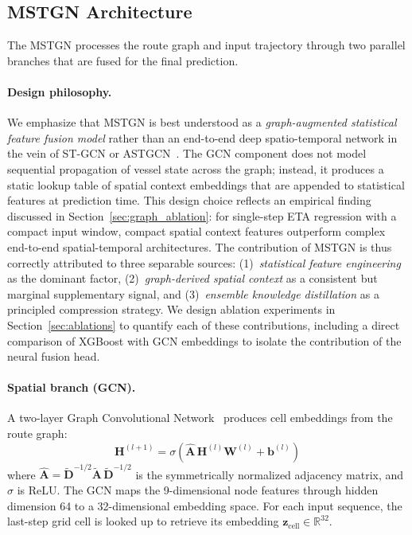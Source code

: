 \documentclass[conference]{IEEEtran}
\begin{document}
\subsection{MSTGN Architecture}
\label{sec:mstgn}

The MSTGN processes the route graph and input trajectory through two parallel branches that are fused for the final prediction.

\paragraph{Design philosophy.}
We emphasize that MSTGN is best understood as a \textit{graph-augmented statistical feature fusion model} rather than an end-to-end deep spatio-temporal network in the vein of ST-GCN or ASTGCN~\cite{daiHybridSpatiotemporalGraph2020}.
The GCN component does not model sequential propagation of vessel state across the graph; instead, it produces a static lookup table of spatial context embeddings that are appended to statistical features at prediction time.
This design choice reflects an empirical finding discussed in Section~\ref{sec:graph_ablation}: for single-step ETA regression with a compact input window, compact spatial context features outperform complex end-to-end spatial-temporal architectures.
The contribution of MSTGN is thus correctly attributed to three separable sources: (1)~\textit{statistical feature engineering} as the dominant factor, (2)~\textit{graph-derived spatial context} as a consistent but marginal supplementary signal, and (3)~\textit{ensemble knowledge distillation} as a principled compression strategy.
We design ablation experiments in Section~\ref{sec:ablations} to quantify each of these contributions, including a direct comparison of XGBoost with GCN embeddings to isolate the contribution of the neural fusion head.

\paragraph{Spatial branch (GCN).}
A two-layer Graph Convolutional Network~\cite{kipf2017gcn} produces cell embeddings from the route graph:
\begin{equation}
    \mathbf{H}^{(l+1)} = \sigma\!\left(\hat{\mathbf{A}} \, \mathbf{H}^{(l)} \mathbf{W}^{(l)} + \mathbf{b}^{(l)}\right)
\end{equation}
where $\hat{\mathbf{A}} = \tilde{\mathbf{D}}^{-1/2} \tilde{\mathbf{A}} \, \tilde{\mathbf{D}}^{-1/2}$ is the symmetrically normalized adjacency matrix, and $\sigma$ is ReLU.
The GCN maps the 9-dimensional node features through hidden dimension 64 to a 32-dimensional embedding space.
For each input sequence, the last-step grid cell is looked up to retrieve its embedding $\mathbf{z}_\text{cell} \in \mathbb{R}^{32}$.
\end{document}
